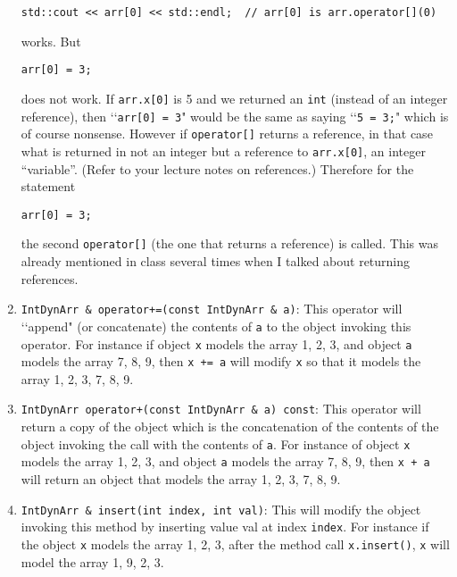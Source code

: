 \begin{enumerate}
\begin{Verbatim}[frame=single]
std::cout << arr[0] << std::endl;  // arr[0] is arr.operator[](0)
\end{Verbatim}

works. But

\begin{Verbatim}[frame=single]
arr[0] = 3;
\end{Verbatim}

does not work. If \verb!arr.x[0]! is 5 and we returned an \verb!int! 
(instead of an integer reference), then \lq\lq \verb!arr[0] = 3!" would 
be the same as saying \lq\lq \verb!5 = 3;!" which is of course nonsense. 
However if \verb!operator[]! returns a reference, in that case what is 
returned in not an integer but a reference to \verb!arr.x[0]!, an integer 
“variable”. (Refer to your lecture notes on references.) Therefore for the 
statement

\begin{Verbatim}[frame=single]
arr[0] = 3;
\end{Verbatim}

the second \verb!operator[]! (the one that returns a reference) is called. 
This was already mentioned in class several times when I talked about 
returning references.

\item \verb!IntDynArr & operator+=(const IntDynArr & a)!: This operator will 
\lq\lq append" (or concatenate) the contents of \verb!a! to the object invoking this 
operator. For instance if object \verb!x! models the array 1, 2, 3, and object 
\verb!a! models the array 7, 8, 9, then \verb!x += a! will modify \verb!x! so that it 
models the array 1, 2, 3, 7, 8, 9.

\item \verb!IntDynArr operator+(const IntDynArr & a) const!: This operator will 
return a copy of the object which is the concatenation of the contents of the 
object invoking the call with the contents of \verb!a!. For instance of object 
\verb!x! models the array 1, 2, 3, and object \verb!a! models the array 7, 8, 9, then 
\verb!x + a! will return an object that models the array 1, 2, 3, 7, 8, 9.

\item \verb!IntDynArr & insert(int index, int val)!: This will modify the 
object invoking this method by inserting value val at index \verb!index!. 
For instance if the object \verb!x! models the array 1, 2, 3, after the 
method call \texttt{x.insert()}, \verb!x! will model 
the array 1, 9, 2, 3.


\end{enumerate}
